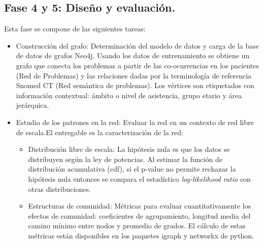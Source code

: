 \subsection{Fase 4 y 5: Diseño y evaluación.} Esta fase se compone de las siguientes tareas:
\begin{itemize}
\item Construcción del grafo: Determinación del modelo de datos y carga de la base de datos de grafos Neo4j. Usando los datos de entrenamiento se obtiene un grafo que conecta los problemas a partir de las co-ocurrencias en los pacientes (Red de Problemas) y las relaciones dadas por la terminología de referencia Snomed CT (Red semántica de problemas). Los vértices son etiquetados con información contextual: ámbito o nivel de asistencia, grupo etario y área jerárquica.  

\item Estudio de los patrones en la red: Evaluar la red en un contexto de red libre de escala.El entregable es la caracterización de la red:
\begin{itemize}
\item Distribución libre de escala: La hipótesis nula es que los datos se distribuyen según la ley de potencias. Al estimar la función de distribución acumulativa (cdf), si el p-value no permite rechazar la hipótesis nula entonces se compara el estadístico \textit{log-likelihood ratio} con otras distribuciones.
\item Estructuras de comunidad: Métricas para evaluar cuantitativamente los efectos de comunidad: coeficientes de agrupamiento, longitud media del camino mínimo entre nodos y promedio de grados. El cálculo de estas métricas están disponibles en los paquetes igraph\cite{igraph} y networkx\cite{SciPyProceedings_11} de python.
\end{itemize}


\end{itemize}
